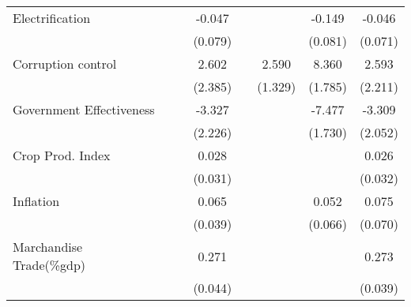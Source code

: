 \begin{table}[H]
\begin{adjustbox}{max width=\textwidth}
\begin{tabular}{l*{7}{c}}
\addlinespace
Electrification&                     &                     &      -0.047         &                     &                     &      -0.149\sym{*}  &      -0.046         \\
            &                     &                     &     (0.079)         &                     &                     &     (0.081)         &     (0.071)         \\
\addlinespace
Corruption control&                     &                     &       2.602         &                     &       2.590\sym{*}  &       8.360\sym{***}&       2.593         \\
            &                     &                     &     (2.385)         &                     &     (1.329)         &     (1.785)         &     (2.211)         \\
\addlinespace
Government Effectiveness&                     &                     &      -3.327         &                     &                     &      -7.477\sym{***}&      -3.309         \\
            &                     &                     &     (2.226)         &                     &                     &     (1.730)         &     (2.052)         \\
\addlinespace
Crop Prod. Index&                     &                     &       0.028         &                     &                     &                     &       0.026         \\
            &                     &                     &     (0.031)         &                     &                     &                     &     (0.032)         \\
\addlinespace
Inflation   &                     &                     &       0.065\sym{*}  &                     &                     &       0.052         &       0.075         \\
            &                     &                     &     (0.039)         &                     &                     &     (0.066)         &     (0.070)         \\
\addlinespace
Marchandise Trade(\%gdp)&                     &                     &       0.271\sym{***}&                     &                     &                     &       0.273\sym{***}\\
            &                     &                     &     (0.044)         &                     &                     &                     &     (0.039)         \\

\end{tabular}
\end{adjustbox}
\end{table}
